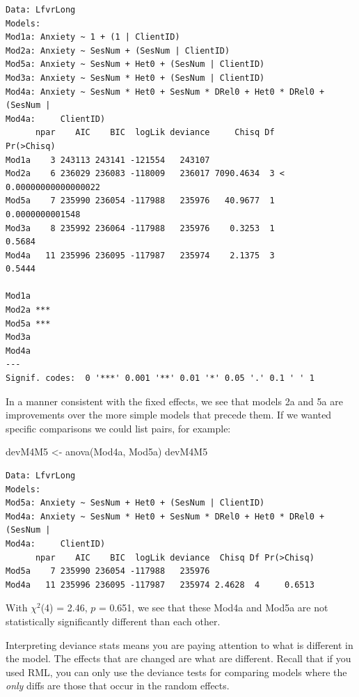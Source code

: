 \documentclass[
  english,
]{book}
\newenvironment{Shaded}{\begin{snugshade}}{\end{snugshade}}
\newcommand{\FunctionTok}[1]{\textcolor[rgb]{0.00,0.00,0.00}{#1}}
\newcommand{\NormalTok}[1]{#1}
\newcommand{\OtherTok}[1]{\textcolor[rgb]{0.56,0.35,0.01}{#1}}
\begin{document}
\begin{verbatim}
Data: LfvrLong
Models:
Mod1a: Anxiety ~ 1 + (1 | ClientID)
Mod2a: Anxiety ~ SesNum + (SesNum | ClientID)
Mod5a: Anxiety ~ SesNum + Het0 + (SesNum | ClientID)
Mod3a: Anxiety ~ SesNum * Het0 + (SesNum | ClientID)
Mod4a: Anxiety ~ SesNum * Het0 + SesNum * DRel0 + Het0 * DRel0 + (SesNum | 
Mod4a:     ClientID)
      npar    AIC    BIC  logLik deviance     Chisq Df            Pr(>Chisq)
Mod1a    3 243113 243141 -121554   243107                                   
Mod2a    6 236029 236083 -118009   236017 7090.4634  3 < 0.00000000000000022
Mod5a    7 235990 236054 -117988   235976   40.9677  1       0.0000000001548
Mod3a    8 235992 236064 -117988   235976    0.3253  1                0.5684
Mod4a   11 235996 236095 -117987   235974    2.1375  3                0.5444
         
Mod1a    
Mod2a ***
Mod5a ***
Mod3a    
Mod4a    
---
Signif. codes:  0 '***' 0.001 '**' 0.01 '*' 0.05 '.' 0.1 ' ' 1
\end{verbatim}

In a manner consistent with the fixed effects, we see that models 2a and 5a are improvements over the more simple models that precede them. If we wanted specific comparisons we could list pairs, for example:

\begin{Shaded}
\begin{Highlighting}[]
\NormalTok{devM4M5 }\OtherTok{\textless{}{-}} \FunctionTok{anova}\NormalTok{(Mod4a, Mod5a) }
\NormalTok{devM4M5}
\end{Highlighting}
\end{Shaded}

\begin{verbatim}
Data: LfvrLong
Models:
Mod5a: Anxiety ~ SesNum + Het0 + (SesNum | ClientID)
Mod4a: Anxiety ~ SesNum * Het0 + SesNum * DRel0 + Het0 * DRel0 + (SesNum | 
Mod4a:     ClientID)
      npar    AIC    BIC  logLik deviance  Chisq Df Pr(>Chisq)
Mod5a    7 235990 236054 -117988   235976                     
Mod4a   11 235996 236095 -117987   235974 2.4628  4     0.6513
\end{verbatim}

With \(\chi^2\)(4) = 2.46, \(p\) = 0.651, we see that these Mod4a and Mod5a are not statistically significantly different than each other.

Interpreting deviance stats means you are paying attention to what is different in the model. The effects that are changed are what are different. Recall that if you used RML, you can only use the deviance tests for comparing models where the \emph{only} diffs are those that occur in the random effects.
\end{document}
